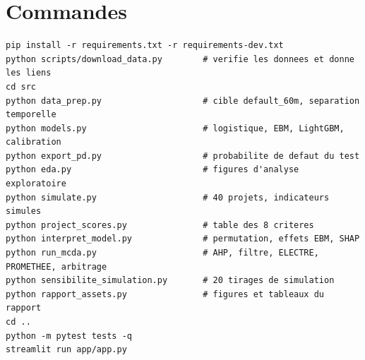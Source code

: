 \section{Commandes}

\begin{lstlisting}
pip install -r requirements.txt -r requirements-dev.txt
python scripts/download_data.py        # verifie les donnees et donne les liens
cd src
python data_prep.py                    # cible default_60m, separation temporelle
python models.py                       # logistique, EBM, LightGBM, calibration
python export_pd.py                    # probabilite de defaut du test
python eda.py                          # figures d'analyse exploratoire
python simulate.py                     # 40 projets, indicateurs simules
python project_scores.py               # table des 8 criteres
python interpret_model.py              # permutation, effets EBM, SHAP
python run_mcda.py                     # AHP, filtre, ELECTRE, PROMETHEE, arbitrage
python sensibilite_simulation.py       # 20 tirages de simulation
python rapport_assets.py               # figures et tableaux du rapport
cd ..
python -m pytest tests -q
streamlit run app/app.py
\end{lstlisting}
